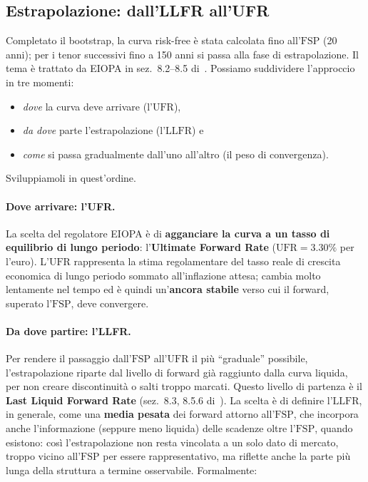 \documentclass[11pt,a4paper]{article}
\theoremstyle{plain}
\theoremstyle{definition}
\theoremstyle{remark}
\newcommand{\UFR}{\mathrm{UFR}}
\newcommand{\LLFR}{\mathrm{LLFR}}
\newcommand{\FSP}{\mathrm{FSP}}
\begin{document}
\subsection{Estrapolazione: dall'LLFR all'UFR}
\label{sec:estrapolazione}

Completato il bootstrap, la curva risk-free è stata calcolata fino all'$\FSP$ (20 anni); per i tenor successivi fino a 150 anni si passa alla
fase di estrapolazione. Il tema è trattato da EIOPA in
sez.~8.2--8.5 di~\cite{eiopa2026}.
Possiamo suddividere l'approccio in tre momenti: \begin{itemize}
  \item \emph{dove} la curva deve arrivare (l'$\UFR$),
  \item \emph{da dove} parte l'estrapolazione (l'$\LLFR$) e
  \item \emph{come} si passa gradualmente dall'uno all'altro (il peso di convergenza).
\end{itemize}
Sviluppiamoli in quest'ordine.

\paragraph{Dove arrivare: l'UFR.}
La scelta del regolatore EIOPA \`e di \textbf{agganciare
la curva a un tasso di equilibrio di lungo periodo}: l'\textbf{Ultimate Forward Rate}
($\UFR = 3.30\%$ per l'euro). L'$\UFR$ rappresenta la
stima regolamentare del tasso reale di crescita economica di lungo periodo sommato
all'inflazione attesa; cambia molto lentamente nel tempo ed \`e quindi un'\textbf{ancora
stabile} verso cui il forward, superato l'$\FSP$, deve convergere.

\paragraph{Da dove partire: l'LLFR.}
Per rendere il passaggio dall'$\FSP$ all'$\UFR$ il più ``graduale'' possibile, l'estrapolazione
riparte dal livello di forward gi\`a raggiunto dalla curva liquida, per non creare
discontinuit\`a o salti troppo marcati.
Questo livello di partenza \`e il \textbf{Last Liquid Forward Rate} (sez.~8.3,
8.5.6 di~\cite{eiopa2026}). La scelta è di definire l'$\LLFR$, in generale, come una
\textbf{media pesata} dei forward attorno all'$\FSP$, che incorpora anche l'informazione
(seppure meno liquida) delle scadenze oltre l'$\FSP$, quando esistono: cos\`i l'estrapolazione
non resta vincolata a un solo dato di mercato, troppo vicino all'$\FSP$ per essere
rappresentativo, ma riflette anche la parte pi\`u lunga della struttura a termine osservabile. Formalmente:
\end{document}
